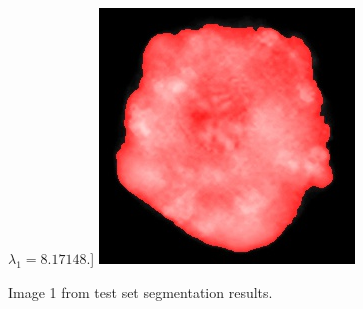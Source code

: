 \documentclass[10pt, journal, letterpaper, onecolumn, draftcls]{IEEEtran}
\begin{document}
\begin{figure}[!h]
	$\lambda_1=8.17148$.]
	{
		\includegraphics[width=\myWidth\columnwidth]{figures/propsedcv/dilated/emgmm2188finmask}
		\label{fig:propsedCVemgmmdilate188}
	}
	\caption{Image 1 from test set segmentation results.}
	\label{fig:testresult188}
\end{figure}
\end{document}
